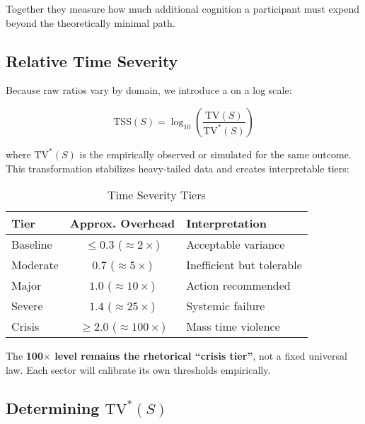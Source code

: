 Together they measure how much additional cognition a participant must expend beyond the theoretically minimal path.

\subsection{Relative Time Severity}
\label{sec:relative-severity}

Because raw ratios vary by domain, we introduce a  on a log scale:

\begin{equation}
\label{eq:tss}
\text{TSS}(S) = \log_{10}\!\left(\frac{\text{TV}(S)}{\text{TV}^*(S)}\right)
\end{equation}

where $\text{TV}^*(S)$ is the empirically observed or simulated  for the same outcome. This transformation stabilizes heavy-tailed data and creates interpretable tiers:

\begin{table}[h]
\centering
\caption{Time Severity Tiers}
\label{tab:severity-tiers}
\begin{tabular}{lcl}
\toprule
\textbf{Tier} & \textbf{Approx. Overhead} & \textbf{Interpretation} \\
\midrule
Baseline & $\leq 0.3$ ($\approx 2\times$) & Acceptable variance \\
Moderate & $0.7$ ($\approx 5\times$) & Inefficient but tolerable \\
Major & $1.0$ ($\approx 10\times$) & Action recommended \\
Severe & $1.4$ ($\approx 25\times$) & Systemic failure \\
Crisis & $\geq 2.0$ ($\approx 100\times$) & Mass time violence \\
\bottomrule
\end{tabular}
\end{table}

The \textbf{100$\times$ level remains the rhetorical ``crisis tier''}, not a fixed universal law. Each sector will calibrate its own thresholds empirically.

\subsection{Determining $\text{TV}^*(S)$}
\label{sec:determining-optimal}

